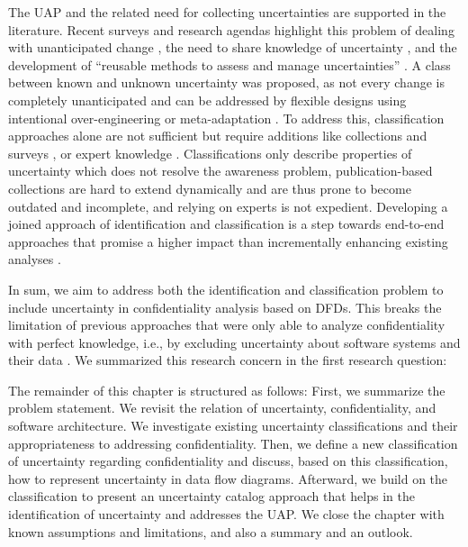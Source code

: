 The \ac{UAP} and the related need for collecting uncertainties are supported in the literature.
Recent surveys and research agendas highlight this problem of dealing with unanticipated change \cite{weyns_introduction_2020}, the need to share knowledge of uncertainty \cite{hezavehi_uncertainty_2021}, and the development of \enquote{reusable methods to assess and manage uncertainties} \cite{weyns_towards_2023}.
A class between known and unknown uncertainty was proposed, as not every change is completely unanticipated and can be addressed by flexible designs using intentional over-engineering or meta-adaptation \cite{garlan_unknown_2021}.
To address this, classification approaches alone are not sufficient but require additions like collections and surveys \cite{ramirez_taxonomy_2012,troya_uncertainty_2021}, or expert knowledge \cite{lytra_supporting_2013,esfahani_guidearch_2013}.
Classifications only describe properties of uncertainty which does not resolve the awareness problem, publication-based collections are hard to extend dynamically and are thus prone to become outdated and incomplete, and relying on experts is not expedient.
Developing a joined approach of identification and classification is a step towards end-to-end approaches that promise a higher impact than incrementally enhancing existing analyses \cite{weyns_towards_2023}.

In sum, we aim to address both the identification and classification problem to include uncertainty in confidentiality analysis based on \acfp{DFD}.
This breaks the limitation of previous approaches that were only able to analyze confidentiality with perfect knowledge, i.e., by excluding uncertainty about software systems and their data \cite{seifermann_architectural_2022}.
We summarized this research concern in the first research question:

\RQone

The remainder of this chapter is structured as follows:
First, we summarize the problem statement.
We revisit the relation of uncertainty, confidentiality, and software architecture.
We investigate existing uncertainty classifications and their appropriateness to addressing confidentiality.
Then, we define a new classification of uncertainty regarding confidentiality and discuss, based on this classification, how to represent uncertainty in data flow diagrams.
Afterward, we build on the classification to present an uncertainty catalog approach that helps in the identification of uncertainty and addresses the \ac{UAP}.
We close the chapter with known assumptions and limitations, and also a summary and an outlook.

